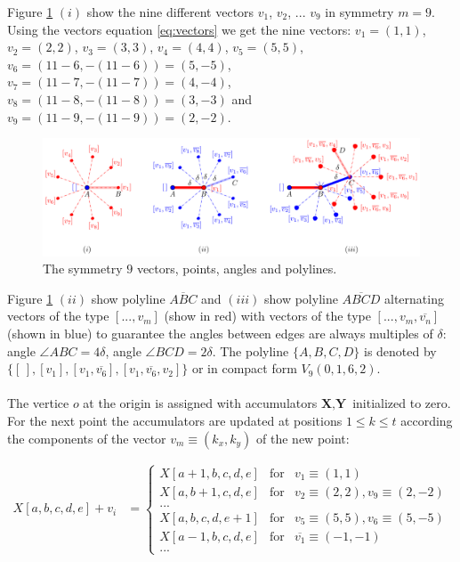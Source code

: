 \documentclass[11pt]{article}
\begin{document}
Figure \ref{fig:vectors-a} $(i)$ show the nine different vectors $v_1$, $v_2$, ... $v_9$ in symmetry $m=9$. Using the vectors equation \ref{eq:vectors} we get the nine vectors:
$v_1 = (1,1)$,
$v_2 = (2,2)$,
$v_3 = (3,3)$,
$v_4 = (4,4)$,
$v_5 = (5,5)$,
$v_6 = (11-6,-(11-6)) = (5,-5)$,
$v_7 = (11-7,-(11-7)) = (4,-4)$,
$v_8 = (11-8,-(11-8)) = (3,-3)$ and
$v_9 = (11-9,-(11-9)) = (2,-2)$.

\begin{figure}[H]
\centering
\includegraphics[scale=1]{vectors-a}
\caption{The symmetry $9$ vectors, points, angles and polylines.}
\label{fig:vectors-a}
\end{figure}

Figure \ref{fig:vectors-a} $(ii)$ show polyline $\overline{ABC}$ and $(iii)$ show polyline $\overline{ABCD}$ alternating vectors of the type $[...,v_m]$ (show in red) with vectors of the type $[...,v_m,\overline{v_n}]$ (shown in blue) to guarantee the angles between edges are always multiples of $\delta$: angle $\angle{ABC} = 4\delta$, angle $\angle{BCD} = 2\delta$. The polyline $\{A,B,C,D\}$ is denoted by $\{ [\hspace{2pt}], [v_1], [v_1, \overline{v_6}], [v_1,\overline{v_6},v_2] \}$ or in compact form $V_9(0,1,6,2)$.
\\
\\
The vertice $o$ at the origin is assigned with accumulators $\textbf{X},\textbf{Y}$ initialized to zero. For the next point the accumulators are updated at positions $1 \leq k \leq t$ according the components of the vector $v_m\equiv(k_x,k_y)$ of the new point:

\begin{align}
X[a,b,c,d,e] + v_i &= \left\{ \begin{array}{ccl}
 X[a+1,b,c,d,e] & \mbox{for} & v_1\equiv(1,1) \\
 X[a,b+1,c,d,e] & \mbox{for} & v_2\equiv(2,2), v_9\equiv(2,-2)\\
 ... & & \\
 X[a,b,c,d,e+1] & \mbox{for} & v_5\equiv(5,5), v_6\equiv(5,-5)\\
 X[a-1,b,c,d,e] & \mbox{for} & \overline{v_1}\equiv(-1,-1) \\
 ... & &
 \end{array}\right.
\end{align}
\end{document}

